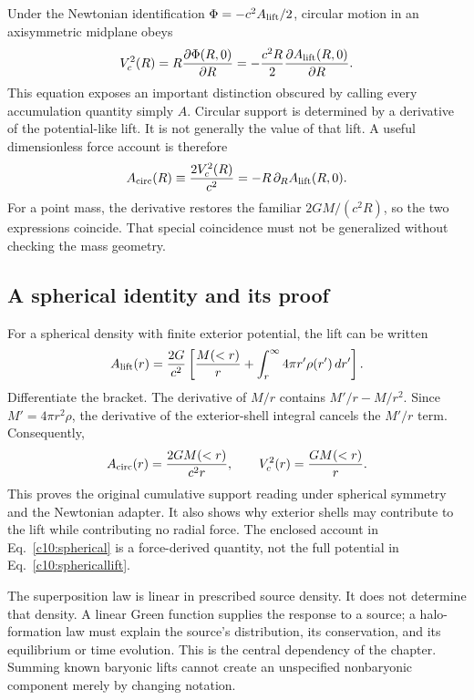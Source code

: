 Under the Newtonian identification $\Phi=-c^2A_{\rm lift}/2$, circular motion in an axisymmetric midplane obeys
\begin{equation}
 V_c^2(R)=R\frac{\partial\Phi(R,0)}{\partial R}
 =-\frac{c^2R}{2}\frac{\partial A_{\rm lift}(R,0)}{\partial R}.
 \label{c10:force}
\end{equation}
This equation exposes an important distinction obscured by calling every accumulation quantity simply $A$. Circular support is determined by a derivative of the potential-like lift. It is not generally the value of that lift. A useful dimensionless force account is therefore
\begin{equation}
 A_{\rm circ}(R)\equiv\frac{2V_c^2(R)}{c^2}
 =-R\,\partial_R A_{\rm lift}(R,0).
 \label{c10:acirc}
\end{equation}
For a point mass, the derivative restores the familiar $2GM/(c^2R)$, so the two expressions coincide. That special coincidence must not be generalized without checking the mass geometry.

\subsection{A spherical identity and its proof}

For a spherical density with finite exterior potential, the lift can be written
\begin{equation}
 A_{\rm lift}(r)=\frac{2G}{c^2}\left[
 \frac{M(<r)}{r}+\int_r^\infty4\pi r'\rho(r')\,dr'\right].
 \label{c10:sphericallift}
\end{equation}
Differentiate the bracket. The derivative of $M/r$ contains $M'/r-M/r^2$. Since $M'=4\pi r^2\rho$, the derivative of the exterior-shell integral cancels the $M'/r$ term. Consequently,
\begin{equation}
 A_{\rm circ}(r)=\frac{2GM(<r)}{c^2r},\qquad
 V_c^2(r)=\frac{GM(<r)}{r}.
 \label{c10:spherical}
\end{equation}
This proves the original cumulative support reading under spherical symmetry and the Newtonian adapter. It also shows why exterior shells may contribute to the lift while contributing no radial force. The enclosed account in Eq.~\eqref{c10:spherical} is a force-derived quantity, not the full potential in Eq.~\eqref{c10:sphericallift}.

The superposition law is linear in prescribed source density. It does not determine that density. A linear Green function supplies the response to a source; a halo-formation law must explain the source's distribution, its conservation, and its equilibrium or time evolution. This is the central dependency of the chapter. Summing known baryonic lifts cannot create an unspecified nonbaryonic component merely by changing notation.

